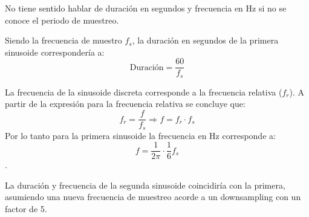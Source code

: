 \begin{enumerate}
    
    No tiene sentido hablar de duración en segundos y frecuencia en Hz si no se conoce el periodo de muestreo.
    
    Siendo la frecuencia de muestro $f_s$, la duración en segundos de la primera sinusoide correspondería a:
    $$ \text{Duración} = \dfrac{60}{f_s}$$
    
    La frecuencia de la sinusoide discreta corresponde a la frecuencia relativa ($f_r$). A partir de la expresión para la frecuencia relativa se concluye que:
    $$ f_r = \dfrac{f}{f_s} \Rightarrow f = f_r\cdot f_s$$
    Por lo tanto para la primera sinusoide la frecuencia en Hz corresponde a:
    $$f = \dfrac{1}{2\pi}\cdot \dfrac{1}{6} f_s$$.
    
    La duración y frecuencia de la segunda sinusoide coincidiría con la primera, asumiendo una nueva frecuencia de muestreo acorde a un downsampling con un factor de 5.
    
    
    






\end{enumerate}
